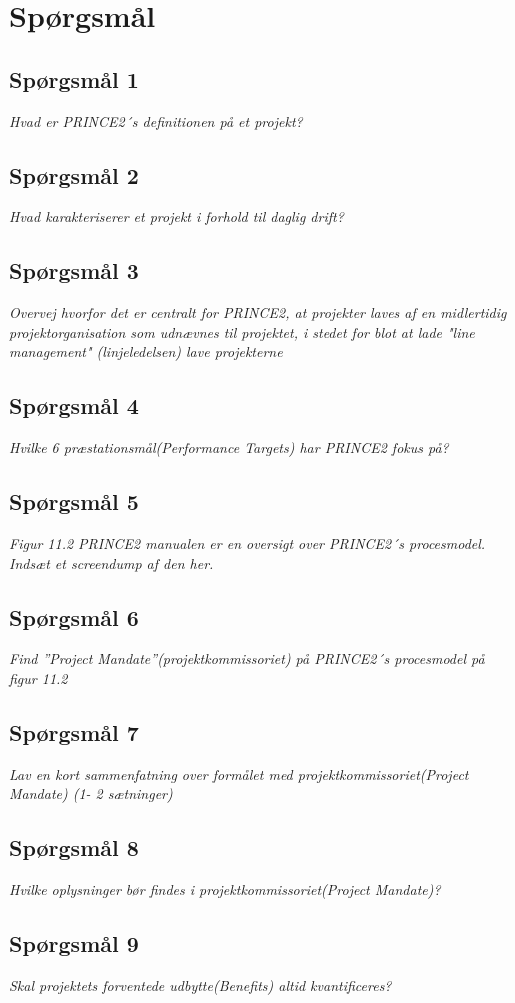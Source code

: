 \chapter{Spørgsmål}

\section{Spørgsmål 1}
\textit{Hvad er PRINCE2´s definitionen på et projekt?}
\section{Spørgsmål 2}
\textit{Hvad karakteriserer et projekt i forhold til daglig drift?}
\section{Spørgsmål 3}
\textit{Overvej hvorfor det er centralt for PRINCE2, at projekter laves af en midlertidig projektorganisation som udnævnes til projektet, i stedet for blot at lade "line management" (linjeledelsen) lave projekterne}
\section{Spørgsmål 4}
\textit{Hvilke 6 præstationsmål(Performance Targets) har PRINCE2 fokus på?}
\section{Spørgsmål 5}
\textit{Figur 11.2 PRINCE2 manualen er en oversigt over PRINCE2´s procesmodel. Indsæt et screendump af den her.}
\section{Spørgsmål 6}
\textit{Find ”Project Mandate”(projektkommissoriet) på PRINCE2´s procesmodel på figur 11.2}
\section{Spørgsmål 7}
\textit{Lav en kort sammenfatning over formålet med projektkommissoriet(Project Mandate) (1- 2 sætninger)}
\section{Spørgsmål 8}
\textit{Hvilke oplysninger bør findes i projektkommissoriet(Project Mandate)?}
\section{Spørgsmål 9}
\textit{Skal projektets forventede udbytte(Benefits) altid kvantificeres?}
